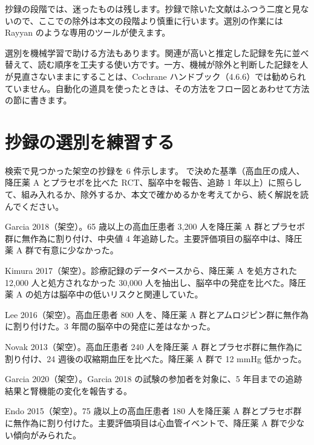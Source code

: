 抄録の段階では、迷ったものは残します。抄録で除いた文献はふつう二度と見ないので、ここでの除外は本文の段階より慎重に行います。選別の作業には Rayyan のような専用のツールが使えます。

\begin{hattenbox}
選別を機械学習で助ける方法もあります。関連が高いと推定した記録を先に並べ替えて、読む順序を工夫する使い方です。一方、機械が除外と判断した記録を人が見直さないままにすることは、Cochrane ハンドブック（4.6.6）では勧められていません。自動化の道具を使ったときは、その方法をフロー図とあわせて方法の節に書きます。
\end{hattenbox}

\section{抄録の選別を練習する}
\label{sec:03-4}

検索で見つかった架空の抄録を 6 件示します。 で決めた基準（高血圧の成人、降圧薬 A とプラセボを比べた RCT、脳卒中を報告、追跡 1 年以上）に照らして、組み入れるか、除外するか、本文で確かめるかを考えてから、続く解説を読んでください。

\begin{description}\small
\item[抄録 1] Garcia 2018（架空）。65 歳以上の高血圧患者 3,200 人を降圧薬 A 群とプラセボ群に無作為に割り付け、中央値 4 年追跡した。主要評価項目の脳卒中は、降圧薬 A 群で有意に少なかった。
\item[抄録 2] Kimura 2017（架空）。診療記録のデータベースから、降圧薬 A を処方された 12,000 人と処方されなかった 30,000 人を抽出し、脳卒中の発症を比べた。降圧薬 A の処方は脳卒中の低いリスクと関連していた。
\item[抄録 3] Lee 2016（架空）。高血圧患者 800 人を、降圧薬 A 群とアムロジピン群に無作為に割り付けた。3 年間の脳卒中の発症に差はなかった。
\item[抄録 4] Novak 2013（架空）。高血圧患者 240 人を降圧薬 A 群とプラセボ群に無作為に割り付け、24 週後の収縮期血圧を比べた。降圧薬 A 群で 12 mmHg 低かった。
\item[抄録 5] Garcia 2020（架空）。Garcia 2018 の試験の参加者を対象に、5 年目までの追跡結果と腎機能の変化を報告する。
\item[抄録 6] Endo 2015（架空）。75 歳以上の高血圧患者 180 人を降圧薬 A 群とプラセボ群に無作為に割り付けた。主要評価項目は心血管イベントで、降圧薬 A 群で少ない傾向がみられた。
\end{description}

